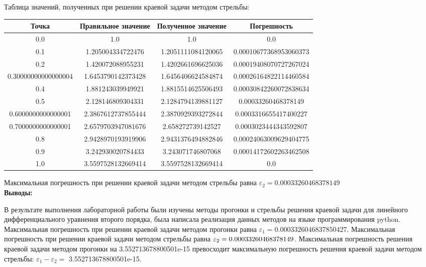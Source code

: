 \documentclass [12pt]{article}
\begin{document}
Таблица значений, полученных при решении краевой задачи методом стрельбы:
\begin{center}
\begin{tabular}{|c|c|c|c|}
\hline
Точка & Правильное значение & Полученное значение & Погрешность \\
\hline
0.0 & 1.0 & 1.0 & 0.0\\
\hline
0.1 & 1.205004334722476 & 1.2051111084120065 & 0.00010677368953060373\\
\hline
0.2 & 1.420072088955231 & 1.4202661696625036 & 0.00019408070727267024\\
\hline
0.30000000000000004 & 1.6453790142373428 & 1.6456406624584874 & 0.00026164822114460584\\
\hline
0.4 & 1.881243039949921 & 1.8815514625506493 & 0.00030842260072838634\\
\hline
0.5 & 2.128146809304331 & 2.1284794139881127 & 0.00033260468378149\\
\hline
0.6000000000000001 & 2.3867612737855444 & 2.3870929393272844 & 0.0003316655417400227\\
\hline
0.7000000000000001 & 2.6579703947081676 & 2.658272739142527 & 0.0003023444343592807\\
\hline
0.8 & 2.9428970193919906 & 2.9431376494882846 & 0.00024063009629404775\\
\hline
0.9 & 3.242930020784433 & 3.243071746807068 & 0.00014172602263462508\\
\hline
1.0 & 3.5597528132669414 & 3.5597528132669414 & 0.0\\
\hline
\end{tabular}
\end{center}

Максимальная погрешность при решении краевой задачи методом стрельбы равна $\varepsilon_2 = 0.00033260468378149$\\

\textbf{Выводы:}

В результате выполнения лабораторной работы были изучены методы прогонки и стрельбы решения краевой задачи для линейного дифференциального уравнения второго порядка, была написала реализация данных методов на языке программирования python. Максимальная погрешность при решении краевой задачи методом прогонки равна $\varepsilon_1 = 0.0003326046837850427$. Максимальная погрешность при решении краевой задачи методом стрельбы равна $\varepsilon_2 =\\
0.00033260468378149$. Максимальная погрешность решения краевой задачи методом прогонки на 3.552713678800501e-15 превосходит максимальную погрешность решения краевой задачи методом стрельбы: $\varepsilon_1 - \varepsilon_2 =$ 3.552713678800501e-15.
\end{document}
